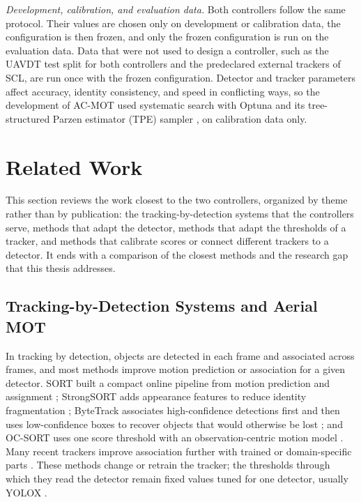 \emph{Development, calibration, and evaluation data.} Both controllers follow the same protocol. Their values are chosen only on development or calibration data, the configuration is then frozen, and only the frozen configuration is run on the evaluation data. Data that were not used to design a controller, such as the UAVDT test split for both controllers and the predeclared external trackers of SCL, are run once with the frozen configuration. Detector and tracker parameters affect accuracy, identity consistency, and speed in conflicting ways, so the development of AC-MOT used systematic search with Optuna and its tree-structured Parzen estimator (TPE) sampler \cite{akiba2019optuna}, on calibration data only.

\section{Related Work}\label{sec:rw}
This section reviews the work closest to the two controllers, organized by theme rather than by publication: the tracking-by-detection systems that the controllers serve, methods that adapt the detector, methods that adapt the thresholds of a tracker, and methods that calibrate scores or connect different trackers to a detector. It ends with a comparison of the closest methods and the research gap that this thesis addresses.

\subsection{Tracking-by-Detection Systems and Aerial MOT}\label{sec:rw-tbd}
In tracking by detection, objects are detected in each frame and associated across frames, and most methods improve motion prediction or association for a given detector. SORT built a compact online pipeline from motion prediction and assignment \cite{bewley2016sort}; StrongSORT adds appearance features to reduce identity fragmentation \cite{du2023strongsort}; ByteTrack associates high-confidence detections first and then uses low-confidence boxes to recover objects that would otherwise be lost \cite{zhang2022bytetrack}; and OC-SORT uses one score threshold with an observation-centric motion model \cite{cao2023ocsort}. Many recent trackers improve association further with trained or domain-specific parts \cite{li2024fdbtrack,bao2024graphmatching,zhang2025sinkhorn,ding2025remot,liang2024motiontrack,sun2026bsr}. These methods change or retrain the tracker; the thresholds through which they read the detector remain fixed values tuned for one detector, usually YOLOX \cite{ge2021yolox}.

